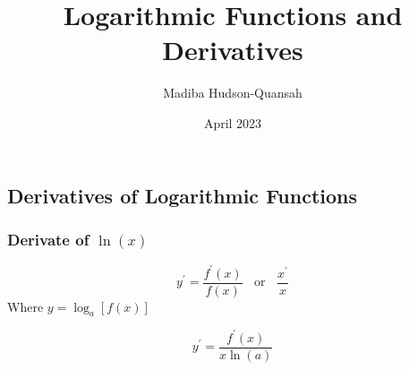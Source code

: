 \documentclass[12pt letter]{report}
\title{\Huge{Logarithmic Functions and Derivatives}}
\author{\huge{Madiba Hudson-Quansah}}
\date{April 2023}
\begin{document}
\maketitle
\newpage
{}
\tableofcontents
\pagebreak

\chapter{}
\section{Derivatives of Logarithmic Functions}

\subsection{Derivate of $\ln(x)$}

\[
	y^{\prime} = \frac{f^{\prime}(x)}{f(x)} \;\; \text{ or } \;\; \frac{x^{\prime}}{x}
\]
Where $y = \log_a[f(x)]$

\[
	y^{\prime} = \frac{f^{\prime}(x)}{x\ln(a)}
\]
\end{document}
